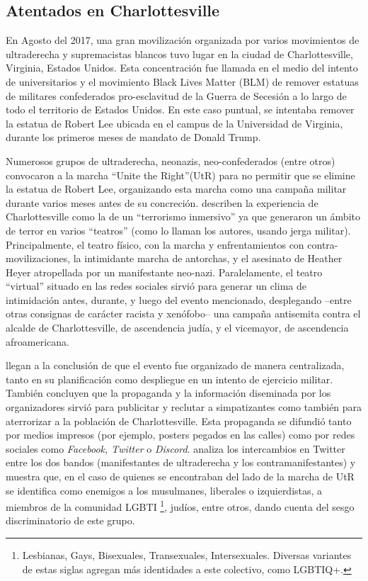 \subsection{Atentados en Charlottesville}

En Agosto del 2017, una gran movilización organizada por varios movimientos de ultraderecha y supremacistas blancos tuvo lugar en la ciudad de Charlottesville, Virginia, Estados Unidos. Esta concentración fue llamada en el medio del intento de universitarios y el movimiento Black Lives Matter (BLM) de remover estatuas de militares confederados pro-esclavitud de la Guerra de Secesión a lo largo de todo el territorio de Estados Unidos. En este caso puntual, se intentaba remover la estatua de Robert Lee ubicada en el campus de la Universidad de Virginia, durante los primeros meses de mandato de Donald Trump.

Numerosos grupos de ultraderecha, neonazis, neo-confederados (entre otros) convocaron a la marcha ``Unite the Right''(UtR) para no permitir que se elimine la estatua de Robert Lee, organizando esta marcha como una campaña militar durante varios meses antes de su concreción. \citet{blout2020white} describen la experiencia de Charlottesville como la de un ``terrorismo inmersivo'' ya que generaron un ámbito de terror en varios ``teatros'' (como lo llaman los autores, usando jerga militar). Principalmente, el teatro físico, con la marcha y enfrentamientos con contra-movilizaciones, la intimidante marcha de antorchas, y el asesinato de Heather Heyer atropellada por un manifestante neo-nazi. Paralelamente, el teatro ``virtual'' situado en las redes sociales sirvió para generar un clima de intimidación antes, durante, y luego del evento mencionado, desplegando --entre otras consignas de carácter racista y xenófobo-- una campaña antisemita contra el alcalde de Charlottesville, de ascendencia judía, y el vicemayor, de ascendencia afroamericana.

\citet{blout2020white} llegan a la conclusión de que el evento fue organizado de manera centralizada, tanto en su planificación como despliegue en un intento de ejercicio militar. También concluyen que la propaganda y la información diseminada por los organizadores sirvió para publicitar y reclutar a simpatizantes como también para aterrorizar a la población de Charlottesville. Esta propaganda se difundió tanto por medios impresos (por ejemplo, posters pegados en las calles) como por redes sociales como \emph{Facebook, Twitter} o \emph{Discord}. \citet{klein2019twitter} analiza los intercambios en Twitter entre los dos bandos (manifestantes de ultraderecha y los contramanifestantes) y muestra que, en el caso de quienes se encontraban del lado de la marcha de UtR se identifica como enemigos a los musulmanes, liberales o izquierdistas, a miembros de la comunidad LGBTI \footnote{Lesbianas, Gays, Bisexuales, Transexuales, Intersexuales. Diversas variantes de estas siglas agregan más identidades a este colectivo, como LGBTIQ+.}, judíos, entre otros, dando cuenta del sesgo discriminatorio de este grupo.



